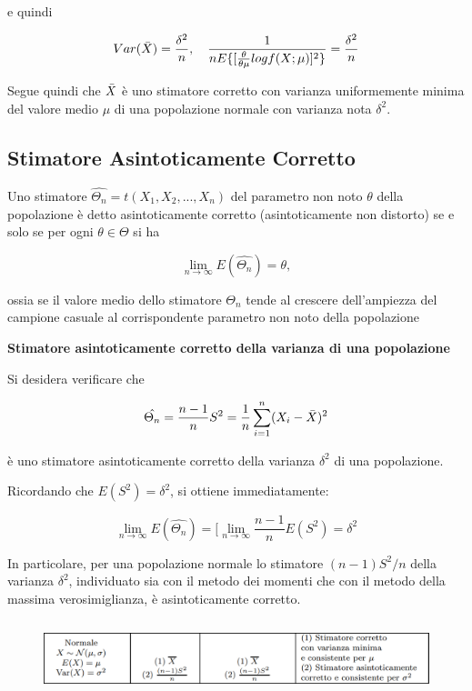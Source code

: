 e quindi

\[Var(\Bar{X}) = \frac{\delta^2}{n}, \quad \frac{1}{nE\{[\frac{\theta}{\theta \mu} log f(X;\mu)]^2\}} = \frac{\delta^2}{n}\]

Segue quindi che $\Bar{X}$ è uno stimatore corretto con varianza uniformemente minima del valore medio $\mu$ di una popolazione normale con varianza nota $\delta^2$.

\subsection{Stimatore Asintoticamente Corretto}

Uno stimatore $\hat{\Theta_n} = t(X_1, X_2, ..., X_n)$ del parametro non noto $\theta$ della popolazione è detto asintoticamente corretto (asintoticamente non distorto) se e solo se per ogni $\theta \in \Theta$ si ha

\[\lim_{n\to\infty} E(\hat{\Theta_n}) = \theta,\]

ossia se il valore medio dello stimatore $\Theta_n$ tende al crescere dell'ampiezza del campione casuale al corrispondente parametro non noto della popolazione

\noindent \textbf{Stimatore asintoticamente corretto della varianza di una popolazione}

Si desidera verificare che 

\[\hat{\Theta_n} = \frac{n-1}{n}S^2 = \frac{1}{n} \sum_{i=1}^n(X_i - \Bar{X})^2\]

è uno stimatore asintoticamente corretto della varianza $\delta^2$ di una popolazione.

Ricordando che $E(S^2) = \delta^2$, si ottiene immediatamente:

\[\lim_{n\to\infty} E(\hat{\Theta_n}) = [\lim_{n\to\infty} \frac{n-1}{n} E(S^2)=\delta^2\]

In particolare, per una popolazione normale lo stimatore $(n-1)S^2/n$ della varianza $\delta^2$, individuato sia con il metodo dei momenti che con il metodo della massima verosimiglianza, è asintoticamente corretto. 

\begin{figure}[!htbp]
    \centering
    \includegraphics[height=2.2cm]{capitoli/images/2_stima_parametri/tabella.png}
\end{figure}
\vspace{5mm}

